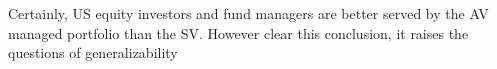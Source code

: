 Certainly, US equity investors and fund managers are better served by the AV managed portfolio than the SV. However clear this conclusion, it raises the questions of generalizability